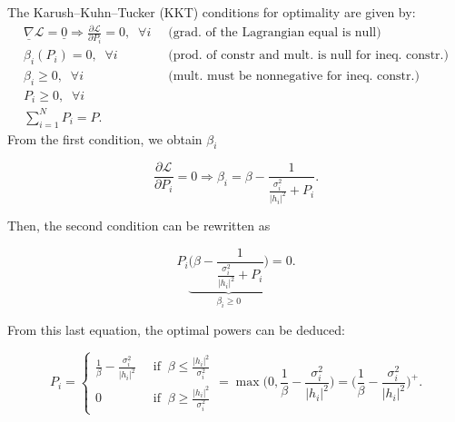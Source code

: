 \documentclass [a4paper, 11pt] {article}
\begin{document}
\begin{solution}
        The Karush–Kuhn–Tucker (KKT) conditions for optimality are given by:
        \begin{align}
            \underline{\nabla}\mathcal{L} = \underline{0} \Rightarrow \frac{\partial \mathcal{L} }{\partial P_i} = 0,  \; \; \forall i & \; \; \text{(grad. of the Lagrangian equal is null)}\\
            \beta_i (P_i) = 0, \; \; \forall i & \; \; \text{(prod. of constr and mult. is null for ineq. constr.)}\\
            \beta_i \geq 0, \; \; \forall i & \; \; \text{(mult. must be nonnegative for ineq. constr.)}\\
            P_i \geq 0, \; \; \forall i & \\
            \sum_{i=1}^{N} P_i = P. & 
        \end{align}
        From the first condition, we obtain $\beta_i$
        
        \begin{equation} \frac{\partial \mathcal{L} }{\partial P_i} = 0 \Rightarrow \beta_i = \beta - \frac{1}{\frac{\sigma_i^2}{|h_i|^2} + P_i}. \end{equation}
        
        Then, the second condition can be rewritten as 
        
        \begin{equation} P_i \underbrace{\Bigg( \beta - \frac{1}{\frac{\sigma_i^2}{|h_i|^2} + P_i} \Bigg)}_{\beta_i \geq 0 } = 0. \end{equation}
        
        
        From this last equation, the optimal powers can be deduced:
        
        \begin{equation*}
            P_i = \begin{cases}
              \frac{1}{\beta} - \frac{\sigma_i^2}{|h_i|^2}&\; \; \text{if} \; \; \beta \leq \frac{|h_i|^2}{\sigma_i^2}  \\
              0 &\; \; \text{if} \; \; \beta \geq \frac{|h_i|^2}{\sigma_i^2}
            \end{cases}  = \max \bigg(0, \frac{1}{\beta} - \frac{\sigma_i^2}{|h_i|^2} \bigg) = \bigg(\frac{1}{\beta} - \frac{\sigma_i^2}{|h_i|^2} \bigg)^+.
        \end{equation*}
        
      
    \end{solution}
    
\end{document}
